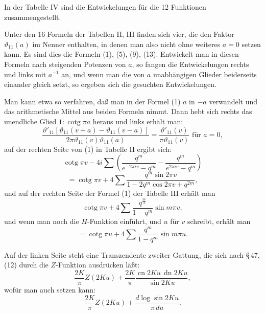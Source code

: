 In der Tabelle IV sind die Entwickelungen für die 12 Funktionen zusammengestellt.

Unter den 16 Formeln der Tabellen II, III finden sich vier, die den Faktor $\vartheta_{11}(a)$ im Nenner enthalten, in denen man also nicht ohne weiteres $a=0$ setzen kann. Es sind dies die Formeln (1), (5), (9), (13). Entwickelt man in diesen Formeln nach steigenden Potenzen von $a$, so fangen die Entwickelungen rechts und links mit $a^{-1}$ an, und wenn man die von $a$ unabhängigen Glieder beiderseits einander gleich setzt, so ergeben sich die gesuchten Entwickelungen.

Man kann etwa so verfahren, daß man in der Formel (1) $a$ in $-a$ verwandelt und das arithmetische Mittel aus beiden Formeln nimmt. Dann hebt sich rechts das unendliche Glied $1:\operatorname{cotg}\pi a$ heraus und links erhält man:
\[
\frac{\vartheta'_{11}[\vartheta_{11}(v+a)-\vartheta_{11}(v-a)]}{2\pi\vartheta_{11}(v)\vartheta_{11}(a)} = \frac{\vartheta'_{11}(v)}{\pi\vartheta_{11}(v)} \text{ für } a=0,
\]
auf der rechten Seite von (1) in Tabelle II ergibt sich:
\[
\operatorname{cotg}\pi v - 4i\sum\left(\frac{q^m}{e^{-2\pi iv}-q^m} - \frac{q^m}{e^{2\pi iv}-q^m}\right)
\]
\[
= \operatorname{cotg}\pi v + 4\sum\frac{q^m\sin 2\pi v}{1-2q^m\cos 2\pi v+q^{2m}},
\]
und auf der rechten Seite der Formel (1) der Tabelle III erhält man
\[
\operatorname{cotg}\pi v + 4\sum\frac{q^{\frac{m}{2}}}{1-q^m}\sin m\pi v,
\]
und wenn man noch die  $H$-Funktion einführt, und $u$ für $v$ schreibt, erhält man
\[
= \operatorname{cotg}\pi u + 4\sum\frac{q^m}{1-q^m}\sin m\pi u.
\]

Auf der linken Seite steht eine Transzendente zweiter Gattung, die sich nach \S\,47, (12) durch die $Z$-Funktion ausdrücken läßt:
\[
\frac{2K}{\pi}Z(2Ku) + \frac{2K}{\pi}\frac{\operatorname{cn}2Ku\,\operatorname{dn}2Ku}{\operatorname{sin}2Ku},
\]
wofür man auch setzen kann:
\[
\frac{2K}{\pi}Z(2Ku) + \frac{d\log\operatorname{sin}2Ku}{\pi\,du}.
\]
